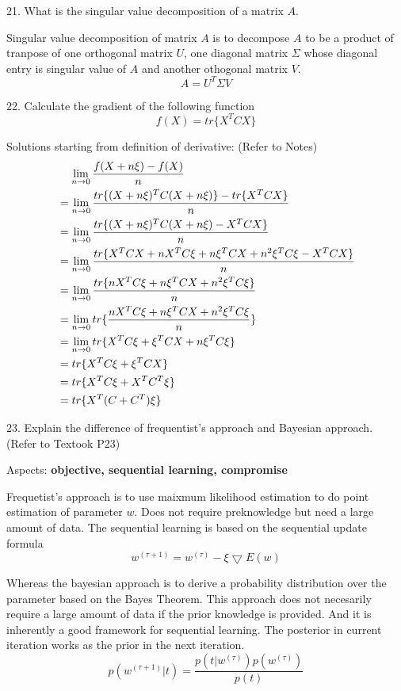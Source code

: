 \documentclass[11pt,a4paper]{article}
\newcommand{\BOLD}[1]{\textbf{#1}}
\begin{document}
21. What is the singular value decomposition of a matrix $A$. 

    Singular value decomposition of matrix $A$ is to decompose $A$ to be a product of tranpose of one orthogonal matrix $U$, one diagonal matrix $\Sigma$ whose diagonal entry is singular value of $A$ and another othogonal matrix $V$. 
    $$
     A = U^T \Sigma V
    $$

22. Calculate the gradient of the following function  
    $$
    f(X) = tr\{ X^T C X\}
    $$

    Solutions starting from definition of derivative: (Refer to Notes)
\begin{align}
    & \hspace{0.4cm} \lim_{n \rightarrow 0} \frac{ f(X + n\xi) - f (X) }{n} \\
    &= \lim_{n \rightarrow 0}  \frac{tr\{ (X + n\xi)^T C (X + n\xi)\} -  tr\{ X^T C X\}}{n} \\
    &= \lim_{n \rightarrow 0} \frac{ tr\{ (X + n\xi)^T C (X + n\xi) - X^T C X\}}{n}  \\
    &= \lim_{n \rightarrow 0}  \frac{ tr\{ X^T CX + nX^TC\xi + n\xi^T CX + n^2\xi^TC\xi- X^T C X\}}{n}  \\
    &= \lim_{n \rightarrow 0} \frac{ tr\{ nX^TC\xi + n\xi^T CX + n^2\xi^TC\xi \}}{n}  \\
    &= \lim_{n \rightarrow 0}  tr\{ \frac{ nX^TC\xi + n\xi^T CX + n^2 \xi^T C \xi}{n} \} \\
    &= \lim_{n \rightarrow 0}  tr\{ X^TC\xi + \xi^T CX + n \xi^T C \xi \} \\
    &=  tr\{ X^TC\xi + \xi^T CX  \} \\
    &=  tr\{ X^TC\xi + X^TC^T \xi  \} \\
    &=  tr\{ X^T(C + C^T)\xi  \} 
\end{align}

23. Explain the difference of frequentist's approach and Bayesian approach. (Refer to Textook P23)

    Aspects: \BOLD{objective, sequential learning, compromise}    

    Frequetist's approach is to use maixmum likelihood estimation to do point estimation of parameter $w$. Does not require preknowledge but need a large amount of data. The sequential learning is based on the sequential update formula
    $$
    w^{(\tau+1)} = w^{(\tau)} - \xi \bigtriangledown E(w)
    $$

    Whereas the bayesian approach is to derive a probability distribution over the parameter based on the Bayes Theorem. This approach does not necesarily require a large amount of data if the prior knowledge is provided. And it is inherently a good framework for sequential learning. The posterior in current iteration works as the prior in the next iteration. 
    $$
    p(w^{(\tau+1)}|t) = \frac{p(t|w^{(\tau)})p(w^{(\tau)})}{p(t)}
    $$
\end{document}
